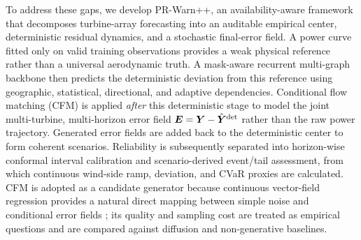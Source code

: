 \documentclass[journal]{IEEEtran}
\newcommand{\1}{\mathbb{I}}
\begin{document}
To address these gaps, we develop PR-Warn++, an availability-aware framework that decomposes turbine-array forecasting into an auditable empirical center, deterministic residual dynamics, and a stochastic final-error field. A power curve fitted only on valid training observations provides a weak physical reference rather than a universal aerodynamic truth. A mask-aware recurrent multi-graph backbone then predicts the deterministic deviation from this reference using geographic, statistical, directional, and adaptive dependencies. Conditional flow matching (CFM) is applied \emph{after} this deterministic stage to model the joint multi-turbine, multi-horizon error field $\bm E=\bm Y-\hat{\bm Y}^{\rm det}$ rather than the raw power trajectory. Generated error fields are added back to the deterministic center to form coherent scenarios. Reliability is subsequently separated into horizon-wise conformal interval calibration and scenario-derived event/tail assessment, from which continuous wind-side ramp, deviation, and CVaR proxies are calculated. CFM is adopted as a candidate generator because continuous vector-field regression provides a natural direct mapping between simple noise and conditional error fields \cite{lipman2023fm,kollovieh2025tsflow}; its quality and sampling cost are treated as empirical questions and are compared against diffusion and non-generative baselines.
\end{document}
